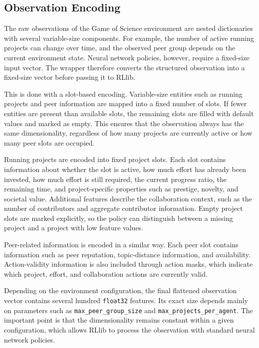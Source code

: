 \documentclass[english,bachelor]{hsluthesis}
\begin{document}
\subsection{Observation Encoding}

The raw observations of the Game of Science environment are nested dictionaries with several variable-size components. For example, the number of active running projects can change over time, and the observed peer group depends on the current environment state. Neural network policies, however, require a fixed-size input vector. The wrapper therefore converts the structured observation into a fixed-size vector before passing it to RLlib.

This is done with a slot-based encoding. Variable-size entities such as running projects and peer information are mapped into a fixed number of slots. If fewer entities are present than available slots, the remaining slots are filled with default values and marked as empty. This ensures that the observation always has the same dimensionality, regardless of how many projects are currently active or how many peer slots are occupied.

Running projects are encoded into fixed project slots. Each slot contains information about whether the slot is active, how much effort has already been invested, how much effort is still required, the current progress ratio, the remaining time, and project-specific properties such as prestige, novelty, and societal value. Additional features describe the collaboration context, such as the number of contributors and aggregate contributor information. Empty project slots are marked explicitly, so the policy can distinguish between a missing project and a project with low feature values.

Peer-related information is encoded in a similar way. Each peer slot contains information such as peer reputation, topic-distance information, and availability. Action-validity information is also included through action masks, which indicate which project, effort, and collaboration actions are currently valid.

Depending on the environment configuration, the final flattened observation vector contains several hundred \texttt{float32} features. Its exact size depends mainly on parameters such as \texttt{max\_peer\_group\_size} and \texttt{max\_projects\_per\_agent}. The important point is that the dimensionality remains constant within a given configuration, which allows RLlib to process the observation with standard neural network policies.
\end{document}
